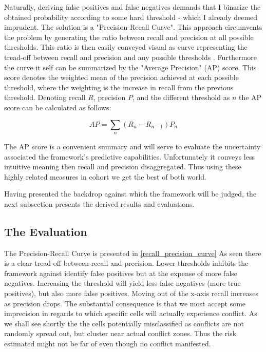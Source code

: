 \documentclass[a4paper]{article}
\begin{document}
Naturally, deriving false positives and false negatives demands that I binarize the obtained probability according to some hard threshold - which I already deemed imprudent. The solution is a "Precision-Recall Curve". This approach circumvents the problem by generating the ratio between recall and precision at all possible thresholds. This ratio is then easily conveyed visual as curve representing the tread-off between recall and precision and any possible thresholds \cite[1278]{He_2008}. Furthermore the curve it self can be summarized by the "Average Precision" (AP) score. This score denotes the weighted mean of the precision achieved at each possible threshold, where the weighting is the increase in recall from the previous threshold. Denoting recall $R$, precision $P$, and the different threshold as $n$ the AP score can be calculated as follows:\par

\[
AP = \sum_n (R_n-R_{n-1})P_n \tag{4} \label{eq:ap}
\]

The AP score is a convenient summary and will serve to evaluate the uncertainty associated the framework's predictive capabilities. Unfortunately it conveys less intuitive meaning then recall and precision disaggregated. Thus using these highly related measures in cohort we get the best of both world.\par

Having presented the backdrop against which the framework will be judged, the next subsection presents the derived results and evaluations.\par

\subsection{The Evaluation}


The Precision-Recall Curve is presented in \autoref{recall_precision_curve} As seen there is a clear tread-off between recall and precision. Lower thresholds inhibits the framework against identify false positives but at the expense of more false negatives. Increasing the threshold will yield less false negatives (more true positives), but also more false positives. Moving out of the x-axis recall increases as precision drops. The substantial consequence is that we most accept some imprecision in regards to which specific cells will actually experience conflict. As we shall see shortly the the cells potentially misclassified as conflicts are not randomly spread out, but cluster near actual conflict zones. Thus the risk estimated might not be far of even though no conflict manifested.\par
\end{document}
